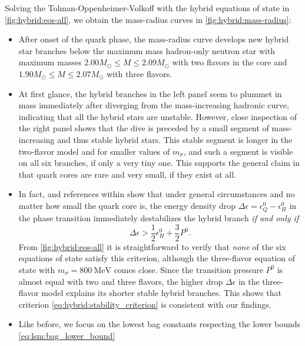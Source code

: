 Solving the Tolman-Oppenheimer-Volkoff with the hybrid equations of state in \cref{fig:hybrid:eos-all},
we obtain the mass-radius curves in \cref{fig:hybrid:mass-radius}:
\begin{itemize}
\item After onset of the quark phase, the mass-radius curve develops new hybrid star branches below the maximum mass hadron-only neutron star
      with maximum masses $2.00 M_\odot \leq M \leq 2.09 M_\odot$ with two flavors in the core
      and $1.90 M_\odot \leq M \leq 2.07 M_\odot$ with three flavors.
\item At first glance, the hybrid branches in the left panel seem to plummet in mass immediately after diverging from the mass-increasing hadronic curve,
      indicating that all the hybrid stars are unstable.
      However, close inspection of the right panel shows that the dive is preceded by a small segment of mass-increasing and thus stable hybrid stars.
      This stable segment is longer in the two-flavor model and for smaller values of $m_\sigma$,
      and such a segment is visible on all six branches, if only a very tiny one.
      This supports the general claim in \cite{ref:quark_star_review} that quark cores are rare and very small, if they exist at all.
\item In fact, \cite[equation 15]{ref:hybrid_star_stability_criterion} and references within show that under general circumstances and no matter how small the quark core is,
      the energy density drop $\Delta \epsilon = \epsilon_Q^0 - \epsilon_H^0$ in the phase transition
      immediately destabilizes the hybrid branch \emph{if and only if}
      \begin{equation}
          \Delta \epsilon > \frac12 \epsilon_H^0 + \frac32 P^0.
      \label{eq:hybrid:stability_criterion}
      \end{equation}
      From \cref{fig:hybrid:eos-all} it is straightforward to verify that \emph{none} of the six equations of state satisfy this criterion,
      although the three-flavor equation of state with $m_\sigma=\SI{800}{\mega\electronvolt}$ comes close.
      Since the transition pressure $P^0$
      is almost equal with two and three flavors,
      the higher drop $\Delta \epsilon$ in the three-flavor model explains its shorter stable hybrid branches.
      This shows that criterion \eqref{eq:hybrid:stability_criterion} is consistent with our findings.
\item Like before, we focus on the lowest bag constants respecting the lower bounds \eqref{eq:lsm:bag_lower_bound}

\end{itemize}
